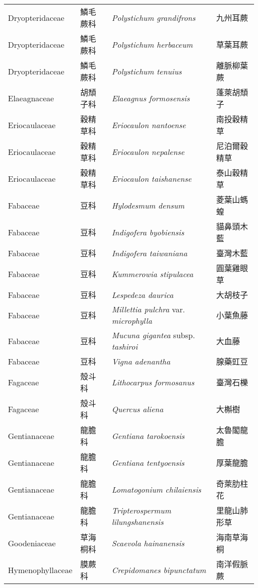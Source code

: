 \begin{longtable}{p{3cm}p{2cm}p{5cm}p{3cm}}
    Dryopteridaceae & 鱗毛蕨科 & \textit{Polystichum grandifrons}  & 九州耳蕨\\
    Dryopteridaceae & 鱗毛蕨科 & \textit{Polystichum herbaceum}  & 草葉耳蕨\\
    Dryopteridaceae & 鱗毛蕨科 & \textit{Polystichum tenuius}  & 離脈柳葉蕨\\
    Elaeagnaceae & 胡頹子科 & \textit{Elaeagnus formosensis}  & 蓬萊胡頹子\\
    Eriocaulaceae & 穀精草科 & \textit{Eriocaulon nantoense}  & 南投穀精草\\
    Eriocaulaceae & 穀精草科 & \textit{Eriocaulon nepalense}  & 尼泊爾穀精草\\
    Eriocaulaceae & 穀精草科 & \textit{Eriocaulon taishanense}  & 泰山穀精草\\
    Fabaceae & 豆科 & \textit{Hylodesmum densum}  & 菱葉山螞蝗\\
    Fabaceae & 豆科 & \textit{Indigofera byobiensis}  & 貓鼻頭木藍\\
    Fabaceae & 豆科 & \textit{Indigofera taiwaniana}  & 臺灣木藍\\
    Fabaceae & 豆科 & \textit{Kummerowia stipulacea}  & 圓葉雞眼草\\
    Fabaceae & 豆科 & \textit{Lespedeza daurica}  & 大胡枝子\\
    Fabaceae & 豆科 & \textit{Millettia pulchra} var. \textit{microphylla}  & 小葉魚藤\\
    Fabaceae & 豆科 & \textit{Mucuna gigantea} subsp. \textit{tashiroi}  & 大血藤\\
    Fabaceae & 豆科 & \textit{Vigna adenantha}  & 腺藥豇豆\\
    Fagaceae & 殼斗科 & \textit{Lithocarpus formosanus}  & 臺灣石櫟\\
    Fagaceae & 殼斗科 & \textit{Quercus aliena}  & 大槲樹\\
    Gentianaceae & 龍膽科 & \textit{Gentiana tarokoensis}  & 太魯閣龍膽\\
    Gentianaceae & 龍膽科 & \textit{Gentiana tentyoensis}  & 厚葉龍膽\\
    Gentianaceae & 龍膽科 & \textit{Lomatogonium chilaiensis}  & 奇萊肋柱花\\
    Gentianaceae & 龍膽科 & \textit{Tripterospermum lilungshanensis}  & 里龍山肺形草\\
    Goodeniaceae & 草海桐科 & \textit{Scaevola hainanensis}  & 海南草海桐\\
    Hymenophyllaceae & 膜蕨科 & \textit{Crepidomanes bipunctatum}  & 南洋假脈蕨\\

\end{longtable}
